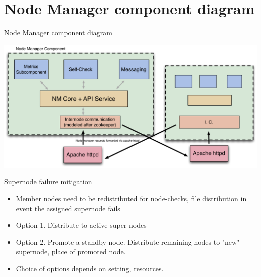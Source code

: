 \documentclass{beamer}
\begin{document}
\section{Node Manager component diagram}
\begin{frame}{Node Manager component diagram}
\begin{center}
\includegraphics[scale=0.45]{NM-design-v2.pdf}
\end{center}
\end{frame}

\begin{frame}{Supernode failure mitigation}

\begin{itemize}
\item
Member nodes need to be redistributed for node-checks, file distribution in event the assigned supernode fails

\item
Option 1.  Distribute to active super nodes
\item
Option 2. Promote a standby node.  Distribute remaining nodes to "new" supernode, place of promoted node.
\item
Choice of options depends on setting, resources.  
\end{itemize}



\end{frame}
\end{document}
